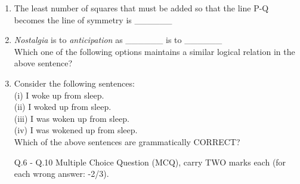 \documentclass[journal]{IEEEtran}
\begin{document}
\begin{enumerate}[start=1]
\item The least number of squares that must be added so that the line P-Q becomes the line of symmetry is \_\_\_\_\_\_
\hfill{}
\begin{enumerate}
\end{enumerate}

\item \textit{Nostalgia} is to \textit{anticipation} as \_\_\_\_\_\_ is to \_\_\_\_\_\_ \\
Which one of the following options maintains a similar logical relation in the above sentence?
\hfill{}
\begin{enumerate}
\end{enumerate}

\item Consider the following sentences:\\
(i) I woke up from sleep.\\
(ii) I woked up from sleep.\\
(iii) I was woken up from sleep.\\
(iv) I was wokened up from sleep.\\
Which of the above sentences are grammatically CORRECT?
\hfill{}
\begin{enumerate}
\end{enumerate}

Q.6 - Q.10 Multiple Choice Question (MCQ), carry TWO marks each (for each wrong answer: -2/3).\\


\end{enumerate}
\end{document}
